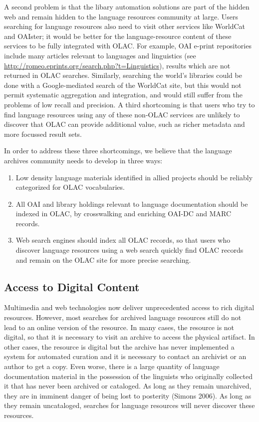 A second problem is that the libary automation solutions are part of
the hidden web and remain hidden to the language resources community
at large.
Users searching for language
resources also need to visit other services like WorldCat and OAIster;
it would be better for the language-resource content
of these services to be fully integrated with OLAC.
For example, OAI e-print repositories include many articles
relevant to languages and linguistics (see
\url{http://romeo.eprints.org/search.php?t=Linguistics}),
results which are not returned in OLAC searches.
Similarly, searching the world's libraries could be done with a
Google-mediated search of the WorldCat site, but this would not
permit systematic aggregation and integration, and would still suffer
from the problems of low recall and precision.
A third shortcoming is that users who try to find language resources
using any of these non-OLAC services are unlikely to discover that
OLAC can provide additional value, such as richer metadata and more
focussed result sets.


In order to address these three shortcomings, we believe that the
language archives community needs to develop in three ways:

\begin{enumerate}\setlength{\itemsep}{0pt}
\item Low density language materials identified in allied projects
      should be reliably categorized for OLAC vocabularies.
\item All OAI and library holdings relevant to language
      documentation should be indexed in OLAC, by
      crosswalking and enriching OAI-DC and MARC records.
\item Web search engines should index all OLAC records, so that
      users who discover language resources using a web search
      quickly find OLAC records and remain on the OLAC site for
      more precise searching.
\end{enumerate}

\subsection{Access to Digital Content}

Multimedia and web technologies now deliver unprecedented access to
rich digital resources.  However, most searches for archived language
resources still do not lead to an online version of the resource.  In
many cases, the resource is not digital, so that it is necessary to
visit an archive to access the physical artifact.  In other cases, the
resource is digital but the archive has never implemented a system for
automated curation and it is necessary to contact an archivist or an
author to get a copy.  Even worse, there is a large quantity of
language documentation material in the possession of the linguists who
originally collected it that has never been archived or cataloged.
As long as they remain unarchived, they are in imminent danger of
being lost to posterity (Simons 2006).  As long as they remain
uncataloged, searches for language resources will never discover
these resources.

